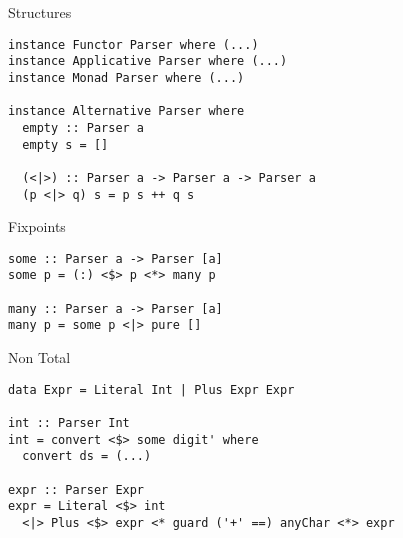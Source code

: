 \documentclass{beamer}
\begin{document}
\begin{frame}[fragile]{Structures}
\begin{verbatim}
instance Functor Parser where (...)
instance Applicative Parser where (...)
instance Monad Parser where (...)

instance Alternative Parser where
  empty :: Parser a
  empty s = []

  (<|>) :: Parser a -> Parser a -> Parser a
  (p <|> q) s = p s ++ q s
\end{verbatim}
\end{frame}

\begin{frame}[fragile]{Fixpoints}
\begin{verbatim}
some :: Parser a -> Parser [a]
some p = (:) <$> p <*> many p

many :: Parser a -> Parser [a]
many p = some p <|> pure []
\end{verbatim}
\end{frame}

\begin{frame}[fragile]{Non Total}
\begin{verbatim}
data Expr = Literal Int | Plus Expr Expr

int :: Parser Int
int = convert <$> some digit' where
  convert ds = (...)

expr :: Parser Expr
expr = Literal <$> int
  <|> Plus <$> expr <* guard ('+' ==) anyChar <*> expr
\end{verbatim}


\begin{verbatim}
\end{verbatim}
\end{frame}
\end{document}
